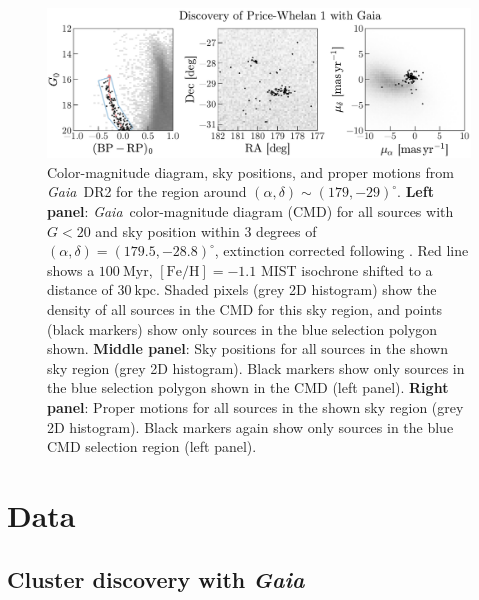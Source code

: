 \documentclass[twocolumn]{aastex62}
\newcommand{\acronym}[1]{{\small{#1}}}
\newcommand{\gaia}{\textsl{Gaia}}
\newcommand{\DR}[1]{\acronym{DR#1}}
\newcommand{\kpc}{\textrm{kpc}}
\newcommand{\feh}{\ensuremath{[\textrm{Fe} / \textrm{H}]}}
\begin{document}
\begin{figure}[t!]
\centering
\includegraphics[width=\textwidth]{figures/gaia-cmd-pm.pdf}
\caption{Color-magnitude diagram, sky positions, and proper motions from \gaia\ \DR{2} for the region around $(\alpha, \delta) \sim (179, -29)^\circ$.
\textbf{Left panel}: \gaia\ color-magnitude diagram (CMD) for all sources with $G < 20$ and sky position within 3 degrees of $(\alpha, \delta) = (179.5, -28.8)^\circ$, extinction corrected following \citet{Danielski:2018}.
Red line shows a $100~\textrm{Myr}$, $\feh = -1.1$ \acronym{MIST} isochrone shifted to a distance of $30~\kpc$.
Shaded pixels (grey 2D histogram) show the density of all sources in the CMD for this sky region, and points (black markers) show only sources in the blue selection polygon shown.
\textbf{Middle panel}: Sky positions for all sources in the shown sky region (grey 2D histogram).
Black markers show only sources in the blue selection polygon shown in the CMD (left panel).
\textbf{Right panel}: Proper motions for all sources in the shown sky region (grey 2D histogram).
Black markers again show only sources in the blue CMD selection region (left panel).
}
\label{fig:cmds}
\end{figure}

\section{Data} \label{sec:data}

\subsection{Cluster discovery with \gaia}
\label{sec:discovery}
\end{document}
